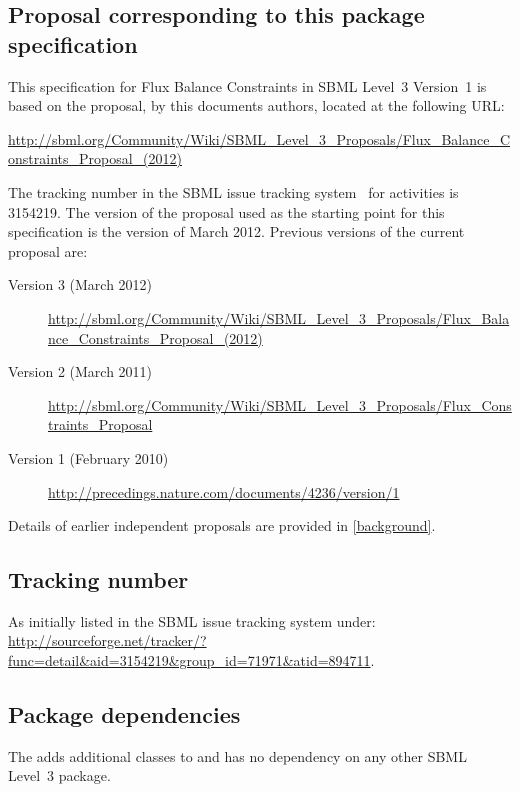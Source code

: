 \subsection{Proposal corresponding to this package specification}

This specification for Flux Balance Constraints in SBML Level~3 Version~1 is based on the proposal, by this documents authors, located at the following URL:
\begin{center}
  \vspace*{1ex}\small
  \url{http://sbml.org/Community/Wiki/SBML_Level_3_Proposals/Flux_Balance_Constraints_Proposal_(2012)}
  \vspace*{1ex}
\end{center}

The tracking number in the SBML issue tracking system~\citep{tracker} for \FBCPackage activities is 3154219.  The version of the proposal used as the starting point for this specification is the version of March 2012. Previous versions of the current proposal are:
\begin{description}
  \item[Version 3 (March 2012)]
  \item [] \small{\url{http://sbml.org/Community/Wiki/SBML_Level_3_Proposals/Flux_Balance_Constraints_Proposal_(2012)}}
  \item[Version 2 (March 2011)]
  \item [] \small{\url{http://sbml.org/Community/Wiki/SBML_Level_3_Proposals/Flux_Constraints_Proposal}}
  \item[Version 1 (February 2010)]
  \item [] \small{\url{http://precedings.nature.com/documents/4236/version/1}}
\end{description}
Details of earlier independent proposals are provided in \ref{background}.

\subsection{Tracking number}
As initially listed in the SBML issue tracking system under: \url{http://sourceforge.net/tracker/?func=detail&aid=3154219&group_id=71971&atid=894711}.

\subsection{Package dependencies}

The \FBCPackage adds additional classes to \sbmlthreecore and has no dependency on any other SBML Level~3 package.

